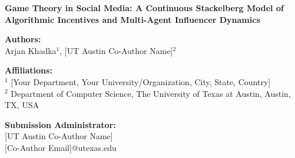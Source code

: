 \documentclass[12pt,letterpaper]{article}
\begin{document}
\begin{titlepage}
\noindent
\textbf{\Large Game Theory in Social Media: A Continuous Stackelberg Model of Algorithmic Incentives and Multi-Agent Influencer Dynamics}

\vspace{1cm}

\noindent
\textbf{Authors:} \\
Arjan Khadka$^1$, [UT Austin Co-Author Name]$^2$

\vspace{0.5cm}

\noindent
\textbf{Affiliations:} \\
$^1$ {[Your Department, Your University/Organization, City, State, Country]} \\
$^2$ Department of Computer Science, The University of Texas at Austin, Austin, TX, USA

\vspace{1cm}

\noindent
\textbf{Submission Administrator:} \\
{[UT Austin Co-Author Name]} \\
{[Co-Author Email]@utexas.edu}

\vspace{1cm}
\end{titlepage}

\linenumbers

\begin{abstract}
Social media platforms represent hyper-competitive ecosystems where influencers constantly optimize strategic decisions to maximize algorithmic engagement. These decisions range from mutually beneficial cross-collaborations to highly publicized inter-personal conflicts or ``beefing.'' In this paper, we propose a mathematical formalization of this ecosystem utilizing a continuous Stackelberg game. The platform algorithm operates as a rational leader, setting exposure rules by dynamically weighting specific user engagement metrics (click-through rate, watch-time retention, and distribution via sharing). Content creators operate as responding followers, optimizing a continuous ``Drama Index'' parameter to maximize utility bounded by the persistent threat of sponsor withdrawal. Utilizing a comprehensive extraction of empirical data via the YouTube API ($N=100$), we establish real-world statistical benchmarks that fundamentally inform our utility functions. We extend this static mathematical framing by constructing a Multi-Agent Reinforcement Learning (MARL) environment, executing a 10,000 epoch simulation. We extract precise phase diagrams and scatter convergence dynamics, proving analytically and computationally how subtle algorithmic priority shifts actuate massive, synchronized population migrations between collaborative and adversarial equilibrium states. 
\end{abstract}
\end{document}
